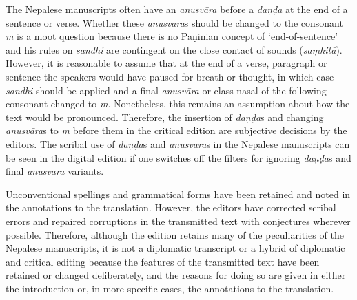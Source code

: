 
The Nepalese manuscripts often have an \emph{anusvāra} before a \emph{daṇḍa} at the end of a sentence or verse. Whether these \emph{anusvāra}s should be changed to the consonant \emph{m} is a moot question because there is no Pāṇinian concept of `end-of-sentence' and his rules on \emph{sandhi} are contingent on the close contact of  sounds (\emph{saṃhitā}). However, it is reasonable to assume that at the end of a verse, paragraph or sentence the speakers would have paused for breath or thought, in which case \emph{sandhi} should be applied and a final \emph{anusvāra} or class nasal of the following consonant changed to \emph{m}.  Nonetheless, this remains an assumption about how the text would be pronounced. Therefore, the insertion of \emph{daṇḍa}s and changing \emph{anusvāra}s to \emph{m} before them in the critical edition are subjective decisions by the editors. The scribal use of \emph{daṇḍa}s and \emph{anusvāra}s in the Nepalese manuscripts can be seen in the digital edition if one switches off the filters for ignoring \emph{daṇḍa}s and final \emph{anusvāra} variants. 

Unconventional spellings and grammatical forms have been retained and noted in the annotations to the translation. However, the editors have corrected scribal errors and repaired corruptions in the transmitted text with conjectures wherever possible. Therefore, although the edition retains many of the peculiarities of the Nepalese manuscripts, it is not a diplomatic transcript or a hybrid of diplomatic and critical editing because the features of the transmitted text have been retained or changed deliberately, and the reasons for doing so are given in either the introduction or, in more specific cases, the annotations to the translation.

